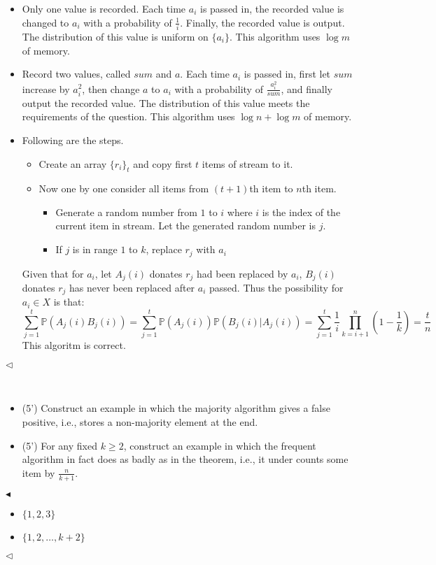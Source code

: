 \documentclass[11pt]{article}
\newenvironment{problem}[2][Problem]{\begin{trivlist}
\item[\hskip \labelsep {\bfseries #1}\hskip \labelsep {\bfseries #2.}]}{\hfill$\blacktriangleleft$\end{trivlist}}
\newenvironment{answer}[1][Answer]{\begin{trivlist}
\item[\hskip \labelsep {\bfseries #1.}\hskip \labelsep]}{\hfill$\lhd$\end{trivlist}}
\begin{document}
\begin{answer}
\begin{itemize}
    \item [(1)] Only one value is recorded. Each time $a_i$ is passed in, the recorded value is changed to $a_i$ with a probability of $\frac{1}{i}$. Finally, the recorded value is output. The distribution of this value is uniform on $\{a_i\}$. This algorithm uses $\log m$ of memory.
    \item [(2)] Record two values, called $sum$ and $a$. Each time $a_i$ is passed in, first let $sum$ increase by $a_i^2$, then change $a$ to $a_i$ with a probability of $\frac{a_i^2}{sum}$, and finally output the recorded value. The distribution of this value meets the requirements of the question. This algorithm uses $\log n + \log m$ of memory.
    \item [(3)]Following are the steps.
    \begin{itemize}
        \item Create an array $\{r_i\}_t$ and copy first $t$ items of stream to it.
        \item Now one by one consider all items from $(t+1)$th item to $n$th item. 
        \begin{itemize}
            \item Generate a random number from $1$ to $i$ where $i$ is the index of the current item in stream. Let the generated random number is $j$.
            \item If $j$ is in range $1$ to $k$, replace $r_j$ with $a_i$
        \end{itemize}
    \end{itemize}
    Given that for $a_i$, let $A_j(i)$ donates $r_j$ had been replaced by $a_i$, $B_j(i)$ donates $r_j$ has never been replaced after $a_i$ passed. Thus the possibility for $a_i \in X$ is that:
    $$\sum_{j=1}^t \mathbb P(A_j(i)B_j(i)) = \sum_{j=1}^t \mathbb P(A_j(i))\mathbb P(B_j(i)|A_j(i)) = \sum_{j=1}^t\frac{1}{i}\prod_{k=i+1}^n(1-\frac{1}{k}) = \frac{t}{n}$$
    This algoritm is correct.
\end{itemize}
\end{answer}

\begin{problem}{4 (10')}~
\begin{itemize}
    \item [(1)] (5') Construct an example in which the majority algorithm gives a false positive, i.e., stores a non-majority element at the end.
    \item [(2)] (5') For any fixed $k \geq 2$, construct an example in which the frequent algorithm in fact does as badly as in the theorem, i.e., it under counts some item by $\frac{n}{k+1}$.
\end{itemize}
\end{problem}
\begin{answer}
\begin{itemize}
    \item [(1)] $\{1,2,3\}$
    \item [(2)] $\{1,2,\dots,k+2\}$
\end{itemize}
\end{answer}
\end{document}
